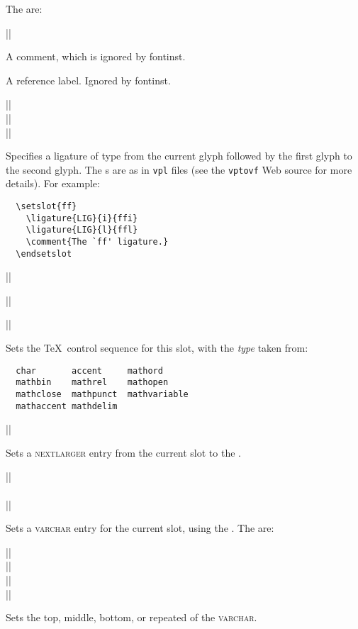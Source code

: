 \documentclass[a4paper]{ltxguide}
\newcommand*{\marg}{\arg}
\newcommand*{\setfilename}[1]{\texttt{#1}}
\newcommand*{\setpackagename}[1]{\textsf{#1}}
\newcommand{\fontinst}{\setpackagename{font\-inst}\xspace}
\newcommand{\vpl}{\setfilename{vpl}\xspace}
\begin{document}
The  are:

\begin{decl}
  |\comment|
\end{decl}
A comment, which is ignored by \fontinst.

A reference label. Ignored by \fontinst.

\begin{decl}
  |\ligature|\\
  |\Ligature|\\
  |\oddligature|\marg{note}
\end{decl}
Specifies a ligature of type  from the current glyph
followed by the first glyph to the second glyph.  The s are
as in \vpl files (see the \texttt{vptovf} Web source for more
details).  For example:
\begin{verbatim}
  \setslot{ff}
    \ligature{LIG}{i}{ffi}
    \ligature{LIG}{l}{ffl}
    \comment{The `ff' ligature.}
  \endsetslot
\end{verbatim}

\begin{decl}
  |\makerightboundary|
\end{decl}

\begin{decl}
  |\Unicode|\marg{code point}\marg{name}
\end{decl}


\begin{decl}
  |\usedas|
\end{decl}
Sets the \TeX\ control sequence for this slot, with the \emph{type}
taken from:
\begin{verbatim}
  char       accent     mathord
  mathbin    mathrel    mathopen
  mathclose  mathpunct  mathvariable
  mathaccent mathdelim
\end{verbatim}

\begin{decl}
  |\nextlarger|
\end{decl}
Sets a \textsc{nextlarger} entry from the current slot to the
.

\begin{decl}
  |\varchar|\\
  \\
  |\endvarchar|
\end{decl}
Sets a \textsc{varchar} entry for the current slot, using the
.  The  are:
\begin{decl}
  |\vartop|\\
  |\varmid|\\
  |\varbot|\\
  |\varrep|
\end{decl}
Sets the top, middle, bottom, or repeated  of the
\textsc{varchar}.
\end{document}
